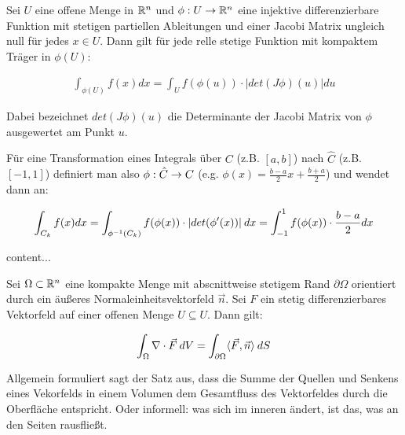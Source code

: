 \begin{satz}
	Sei $U$ eine offene Menge in $\mathbb{R}^n$ und $\phi : U \rightarrow \mathbb{R}^n$ eine injektive differenzierbare Funktion mit stetigen partiellen Ableitungen und einer Jacobi Matrix ungleich null für jedes $x \in U$. Dann gilt für jede relle stetige Funktion mit kompaktem Träger in $\phi(U)$:
	
	\begin{align*}
		\int_{\phi(U)}	 f(x) dx = \int_U f(\phi(u)) \cdot |det(J \phi)(u)| du
 	\end{align*}
 	
 	Dabei bezeichnet $det(J \phi)(u)$ die Determinante der Jacobi Matrix von $\phi$ ausgewertet am Punkt $u$.
 	
 	Für eine Transformation eines Integrals über $C$ (z.B. $[a,b]$) nach $\hat{C}$ (z.B. $[-1,1]$) definiert man also $\phi : \hat{C} \rightarrow C$ (e.g. $\phi(x) = \frac{b - a}{2}x + \frac{b + a}{2}$) und wendet dann an:
 	
 	\begin{align*}
 		\int_{C_k} f(x) dx = \int_{\phi^{-1}(C_k)} f(\phi(x)) \cdot |det(\phi'(x))| \medspace dx = \int_{-1}^{1} f(\phi(x)) \cdot \frac{b - a}{2} dx
 	\end{align*}
	
\end{satz}

\begin{satz}
	content...
\end{satz}

\begin{satz}
	Sei $\Omega \subset \mathbb{R}^n$ eine kompakte Menge mit abscnittweise stetigem Rand $\partial \Omega$ orientiert durch ein äußeres Normaleinheitsvektorfeld $\vec{n}$. Sei $F$ ein stetig differenzierbares Vektorfeld auf einer offenen Menge $U \subseteq U$. Dann gilt:
	
	\begin{align*}
		\int_\Omega \nabla \cdot \vec{F} \medspace dV = \int_{\partial \Omega} \langle \vec{F}, \vec{n} \rangle \medspace dS
	\end{align*}
	
	Allgemein formuliert sagt der Satz aus, dass die Summe der Quellen und Senkens eines Vekorfelds in einem Volumen dem Gesamtfluss des Vektorfeldes durch die Oberfläche entspricht.
	Oder informell: was sich im inneren ändert, ist das, was an den Seiten rausfließt.	
	
\end{satz}

